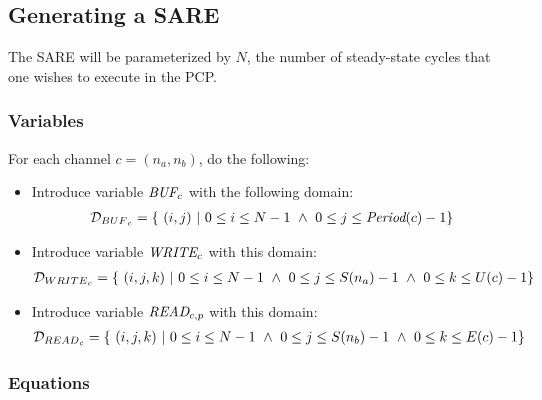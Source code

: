 \subsection{Generating a SARE}

The SARE will be parameterized by $N$, the number of steady-state
cycles that one wishes to execute in the PCP.

\subsubsection{Variables}

For each channel $c = (n_a, n_b)$, do the following:
\begin{itemize}

\item Introduce variable $\mbox{\it BUF}_c$ with the following domain:
\begin{align*}
{\cal D}_{{BUF}_c} = \{ ~(i,j)~|~0 \le i \le N - 1 ~\wedge~ 0 \le j \le \mbox{\it Period}(c) - 1\}
\end{align*}

\item Introduce variable $\mbox{\it WRITE}_{c}$ with this domain:
\begin{align*}
{\cal D}_{{WRITE}_{c}} = \{~(i,j,k)~|~0 \le i \le N-1 ~\wedge~ 
                                       0 \le j \le S(n_a) - 1 ~\wedge~ 0 \le k \le U(c) - 1\}
\end{align*}

\item Introduce variable $\mbox{\it READ}_{c, p}$ with this domain:
\begin{align*}
{\cal D}_{{READ}_{c}} = \{~(i,j,k)~|~0 \le i \le N-1 ~\wedge~ 
                                      0 \le j \le S(n_b) - 1 ~\wedge~ 
                                      0 \le k \le E(c) - 1\} \\
\end{align*}

\end{itemize}

\subsubsection{Equations}

